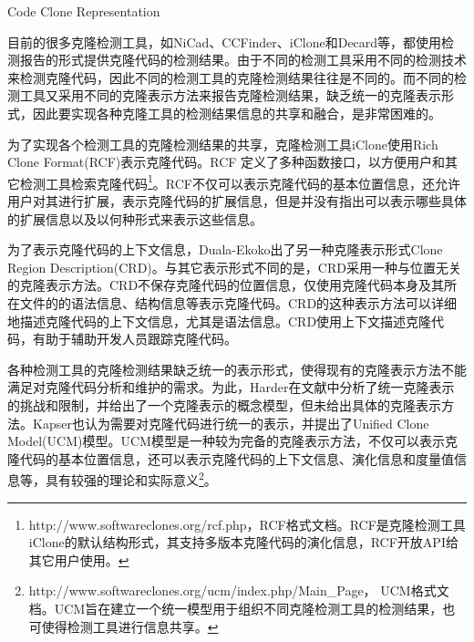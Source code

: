 {Code Clone Representation}


目前的很多克隆检测工具，如NiCad、CCFinder、iClone和Decard等，都使用检测报告的形式提供克隆代码的检测结果。由于不同的检测工具采用不同的检测技术来检测克隆代码，因此不同的检测工具的克隆检测结果往往是不同的。而不同的检测工具又采用不同的克隆表示方法来报告克隆检测结果，缺乏统一的克隆表示形式，因此要实现各种克隆工具的检测结果信息的共享和融合，是非常困难的。

为了实现各个检测工具的克隆检测结果的共享，克隆检测工具iClone使用Rich Clone Format(RCF)表示克隆代码\cite{harder2011efficiently}。RCF 定义了多种函数接口，以方便用户和其它检测工具检索克隆代码\footnote{http://www.softwareclones.org/rcf.php，RCF格式文档。RCF是克隆检测工具iClone的默认结构形式，其支持多版本克隆代码的演化信息，RCF开放API给其它用户使用。}。RCF不仅可以表示克隆代码的基本位置信息，还允许用户对其进行扩展，表示克隆代码的扩展信息，但是并没有指出可以表示哪些具体的扩展信息以及以何种形式来表示这些信息。%

为了表示克隆代码的上下文信息，Duala-Ekoko出了另一种克隆表示形式Clone Region Description(CRD)\cite{duala2010clone}。与其它表示形式不同的是，CRD采用一种与位置无关的克隆表示方法。CRD不保存克隆代码的位置信息，仅使用克隆代码本身及其所在文件的的语法信息、结构信息等表示克隆代码。CRD的这种表示方法可以详细地描述克隆代码的上下文信息，尤其是语法信息。CRD使用上下文描述克隆代码，有助于辅助开发人员跟踪克隆代码。%

各种检测工具的克隆检测结果缺乏统一的表示形式，使得现有的克隆表示方法不能满足对克隆代码分析和维护的需求。为此，Harder在文献\cite{harder2013limits}中分析了统一克隆表示的挑战和限制，并给出了一个克隆表示的概念模型，但未给出具体的克隆表示方法。Kapser也认为需要对克隆代码进行统一的表示，并提出了Unified Clone Model(UCM)模型\cite{kapser2012common}。UCM模型是一种较为完备的克隆表示方法，不仅可以表示克隆代码的基本位置信息，还可以表示克隆代码的上下文信息、演化信息和度量值信息等，具有较强的理论和实际意义\footnote{http://www.softwareclones.org/ucm/index.php/Main\_Page， UCM格式文档。UCM旨在建立一个统一模型用于组织不同克隆检测工具的检测结果，也可使得检测工具进行信息共享。}。

